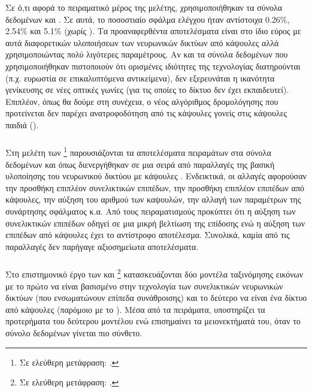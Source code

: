  Σε ό,τι αφορά το πειραματικό μέρος της μελέτης, χρησιμοποιήθηκαν τα σύνολα δεδομένων  και . Σε αυτά, το ποσοστιαίο σφάλμα ελέγχου ήταν αντίστοιχα 0.26\%, 2.54\% και 5.1\% (χωρίς ). Τα προαναφερθέντα αποτελέσματα είναι στο ίδιο εύρος με αυτά διαφορετικών υλοποιήσεων των νευρωνικών δικτύων από κάψουλες αλλά χρησιμοποιώντας πολύ λιγότερες παραμέτρους. Αν και τα σύνολα δεδομένων που χρησιμοποιήθηκαν πιστοποιούν ότι ορισμένες ιδιότητες της τεχνολογίας διατηρούνται (π.χ. ευρωστία σε επικαλυπτόμενα αντικείμενα), δεν εξερευνάται η ικανότητα γενίκευσης σε νέες οπτικές γωνίες (για τις οποίες το δίκτυο δεν έχει εκπαιδευτεί). Επιπλέον, όπως θα δούμε στη συνέχεια, ο νέος αλγόριθμος δρομολόγησης που προτείνεται δεν παρέχει ανατροφοδότηση από τις κάψουλες γονείς στις κάψουλες παιδιά ().

 \subsubsection{}

Στη μελέτη των  \footnote{Σε ελεύθερη μετάφραση: .} \cite{xi2017capsule} παρουσιάζονται τα αποτελέσματα πειραμάτων στα σύνολα δεδομένων  και  όπως διενεργήθηκαν σε μια σειρά από παραλλαγές της βασική υλοποίησης του νευρωνικού δικτύου με κάψουλες \cite{sabour2017dynamic}. Ενδεικτικά, οι αλλαγές αφορούσαν την προσθήκη επιπλέον συνελικτικών επιπέδων, την προσθήκη επιπλέον επιπέδων από κάψουλες, την αύξηση του αριθμού των καψουλών, την αλλαγή των παραμέτρων της συνάρτησης σφάλματος κ.α. Από τους πειραματισμούς προκύπτει ότι η αύξηση των συνελικτικών επιπέδων οδηγεί σε μια μικρή βελτίωση της επίδοσης ενώ η αύξηση των επιπέδων από κάψουλες έχει το αντίστροφο αποτέλεσμα. Συνολικά, καμία από τις παραλλαγές δεν παρήγαγε αξιοσημείωτα αποτελέσματα.

\subsubsection{}

Στο επιστημονικό έργο των  και  \footnote{Σε ελεύθερη μετάφραση: .} \cite{dong2019research} κατασκευάζονται δύο μοντέλα ταξινόμησης εικόνων με το πρώτο να είναι βασισμένο στην τεχνολογία των  συνελικτικών νευρωνικών δικτύων (που ενσωματώνουν επίπεδα συνάθροισης) και το δεύτερο να είναι ένα δίκτυο από κάψουλες (παρόμοιο με το \cite{sabour2017dynamic}). Μέσα από τα πειράματα, υποστηρίζει τα προτερήματα του δεύτερου μοντέλου ενώ επισημαίνει τα μειονεκτήματά του, όταν το σύνολο δεδομένων γίνεται πιο σύνθετο. 

